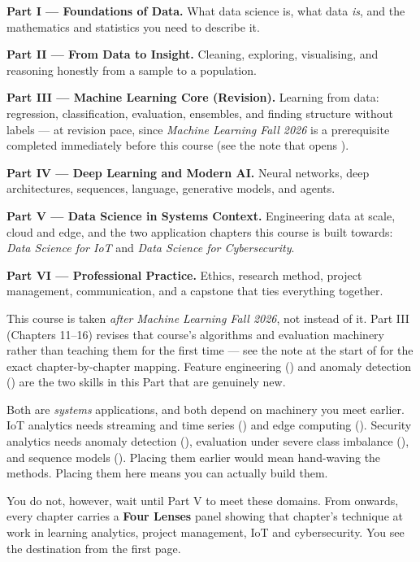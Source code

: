 \begin{tight}
  \item \textbf{Part I --- Foundations of Data.} What data science is, what data
        \emph{is}, and the mathematics and statistics you need to describe it.
  \item \textbf{Part II --- From Data to Insight.} Cleaning, exploring,
        visualising, and reasoning honestly from a sample to a population.
  \item \textbf{Part III --- Machine Learning Core (Revision).} Learning from
        data: regression, classification, evaluation, ensembles, and finding
        structure without labels --- at revision pace, since \emph{Machine
        Learning Fall 2026} is a prerequisite completed immediately before this
        course (see the note that opens ).
  \item \textbf{Part IV --- Deep Learning and Modern AI.} Neural networks, deep
        architectures, sequences, language, generative models, and agents.
  \item \textbf{Part V --- Data Science in Systems Context.} Engineering data at
        scale, cloud and edge, and the two application chapters this course is
        built towards: \emph{Data Science for IoT} and \emph{Data Science for
        Cybersecurity}.
  \item \textbf{Part VI --- Professional Practice.} Ethics, research method,
        project management, communication, and a capstone that ties everything
        together.
\end{tight}

\begin{conceptbox}
This course is taken \emph{after} \emph{Machine Learning Fall 2026}, not instead
of it. Part III (Chapters 11--16) revises that course's algorithms and
evaluation machinery rather than teaching them for the first time --- see the
note at the start of  for the exact chapter-by-chapter
mapping. Feature engineering () and anomaly detection
() are the two skills in this Part that are genuinely new.
\end{conceptbox}

\begin{conceptbox}
Both are \emph{systems} applications, and both depend on machinery you meet
earlier. IoT analytics needs streaming and time series () and
edge computing (). Security analytics needs anomaly detection
(), evaluation under severe class imbalance
(), and sequence models (). Placing them
earlier would mean hand-waving the methods. Placing them here means you can
actually build them.

You do not, however, wait until Part V to meet these domains. From
 onwards, every chapter carries a \textbf{Four Lenses} panel
showing that chapter's technique at work in learning analytics, project
management, IoT and cybersecurity. You see the destination from the first page.
\end{conceptbox}

